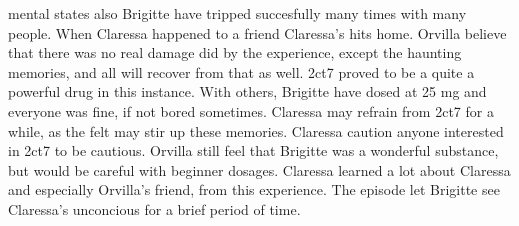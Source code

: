 \documentclass[12pt]{book}
\begin{document}
mental states also Brigitte have tripped succesfully many times with many people. When Claressa happened to a friend Claressa's hits home. Orvilla believe that there was no real damage did by the experience, except the haunting memories, and all will recover from that as well. 2ct7 proved to be a quite a powerful drug in this instance. With others, Brigitte have dosed at 25 mg and everyone was fine, if not bored sometimes. Claressa may refrain from 2ct7 for a while, as the felt may stir up these memories. Claressa caution anyone interested in 2ct7 to be cautious. Orvilla still feel that Brigitte was a wonderful substance, but would be careful with beginner dosages. Claressa learned a lot about Claressa and especially Orvilla's friend, from this experience. The episode let Brigitte see Claressa's unconcious for a brief period of time.
\end{document}
